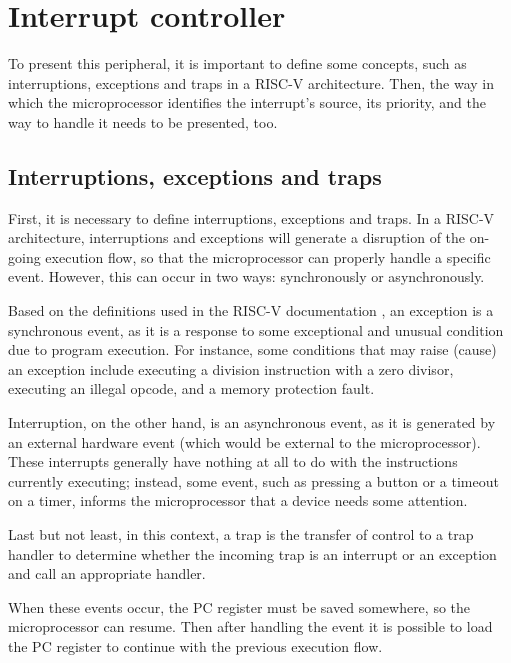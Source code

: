     \section{Interrupt controller}\label{sec:section_p.2}

        To present this peripheral, it is important to define some concepts, such as interruptions, exceptions and traps in a RISC-V architecture. Then, the way in which the microprocessor identifies the interrupt's source, its priority, and the way to handle it needs to be presented, too.
    
        \subsection{Interruptions, exceptions and traps}
    
            First, it is necessary to define interruptions, exceptions and traps. In a RISC-V architecture, interruptions and exceptions will generate a disruption of the on-going execution flow, so that the microprocessor can properly handle a specific event. However, this can occur in two ways: synchronously or asynchronously.
        
            Based on the definitions used in the RISC-V documentation \cite{panesar_2022}, an exception is a synchronous event, as it is a response to some exceptional and unusual condition due to program execution. For instance, some conditions that may raise (cause) an exception include executing a division instruction with a zero divisor, executing an illegal opcode, and a memory protection fault. 
    
    	    Interruption, on the other hand, is an asynchronous event, as it is generated by an external hardware event (which would be external to the microprocessor). These interrupts generally have nothing at all to do with the instructions currently executing; instead, some event, such as pressing a button or a timeout on a timer, informs the microprocessor that a device needs some attention.
    
            Last but not least, in this context, a trap is the transfer of control to a trap handler to determine whether the incoming trap is an interrupt or an exception and call an appropriate handler.
    
    	    When these events occur, the PC register must be saved somewhere, so the microprocessor can resume. Then after handling the event it is possible to load the PC register to continue with the previous execution flow.

